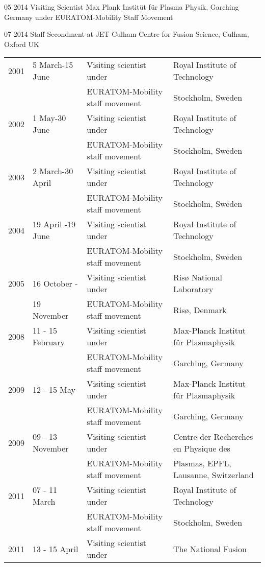 {\begin{entrylist}
\entry
{05 2014}
{Visiting Scientist}
{Max Plank Instit{\"u}t f\"ur Plasma Physik,  Garching Germany}
{under EURATOM-Mobility Staff Movement}


\entry
{07 2014}
{Staff Secondment at JET}
{Culham Centre for Fusion Science,  Culham, Oxford UK}
{}


\end{entrylist}
}{

\begin{longtable}{llll}
2001 & 5 March-15 June & Visiting scientist under& Royal Institute of
Technology\\
 & & EURATOM-Mobility
staff movement &  Stockholm, Sweden \\

2002 & 1 May-30 June & Visiting scientist under& Royal Institute of
Technology\\
 & & EURATOM-Mobility
staff movement &  Stockholm, Sweden \\
2003 & 2 March-30 April & Visiting scientist under& Royal Institute of
Technology\\
 & & EURATOM-Mobility
staff movement &  Stockholm, Sweden \\
2004 & 19 April -19 June & Visiting scientist under& Royal Institute of
Technology\\
 & & EURATOM-Mobility
staff movement &  Stockholm, Sweden \\
2005 & 16 October - & Visiting scientist under& Ris{\o}
National Laboratory\\
 & 19 November & EURATOM-Mobility
staff movement &  Ris{\o}, Denmark \\
2008 & 11 - 15 February & Visiting scientist under& Max-Planck
Institut f\"ur Plasmaphysik \\
 & & EURATOM-Mobility
staff movement &  Garching, Germany \\
2009 & 12 - 15 May & Visiting scientist under& Max-Planck
Institut f\"ur Plasmaphysik \\
 & & EURATOM-Mobility
staff movement &  Garching, Germany \\
2009 & 09 - 13 November & Visiting scientist under& Centre der
Recherches en Physique des \\
 & & EURATOM-Mobility
staff movement & Plasmas, EPFL, Lausanne, Switzerland \\
2011 & 07 - 11 March & Visiting scientist under& Royal Institute of
Technology\\
 & & EURATOM-Mobility
staff movement &  Stockholm, Sweden \\
2011 & 13 - 15 April & Visiting scientist under& The National Fusion

\end{longtable}}
